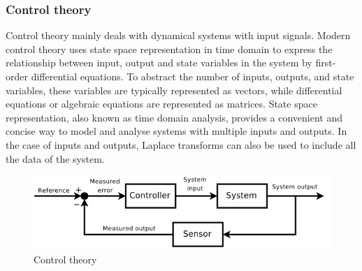 \documentclass[11pt,a4paper]{article}
\begin{document}
\subsubsection{Control theory}
Control theory mainly deals with dynamical systems with input signals. Modern control theory uses state space representation in time domain to express the relationship between input, output and state variables in the system by first-order differential equations. To abstract the number of inputs, outputs, and state variables, these variables are typically represented as vectors, while differential equations or algebraic equations are represented as matrices. State space representation, also known as time domain analysis, provides a convenient and concise way to model and analyse systems with multiple inputs and outputs. In the case of inputs and outputs, Laplace transforms can also be used to include all the data of the system\citep{lee1967foundations}.
\\
\begin{figure}[ht!]
\centering
\includegraphics[scale=0.4]{3.png}
\caption{Control theory}
\label{fig:Control theory}
\end{figure}
\\
\end{document}

